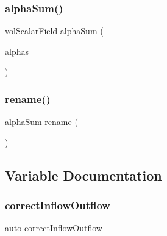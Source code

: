 \mbox{\label{alphaEqns__2p_8H_a3ab8a679df9d81448b079e49656fb68b}} 
\subsubsection{\texorpdfstring{alpha\+Sum()}{alphaSum()}}
{\footnotesize\ttfamily vol\+Scalar\+Field alpha\+Sum (\begin{DoxyParamCaption}\item[{\hyperlink{UEqns__2p_8H_ad67e06bee4c61d3ec617e035493b4722}{alpha1}+\hyperlink{UEqns__2p_8H_abe544d8197b804c4439afde6d860d5d7}{alpha2}+}]{alphas }\end{DoxyParamCaption})}

\mbox{\label{alphaEqns__2p_8H_af1e0a8120145b9a722d2cbde048f2776}} 
\subsubsection{\texorpdfstring{rename()}{rename()}}
{\footnotesize\ttfamily \hyperlink{alphaEqns__2p_8H_a3ab8a679df9d81448b079e49656fb68b}{alpha\+Sum} rename (\begin{DoxyParamCaption}\item[{\char`\"{}sum(\hyperlink{UEqn__1pl_8H_a7fe02434a19f3e00e927f32adcbb193b}{alpha})\char`\"{}}]{ }\end{DoxyParamCaption})}



\subsection{Variable Documentation}
\mbox{\label{alphaEqns__2p_8H_a09af02a4dbb4e475efb7755f0dd0bebd}} 
\subsubsection{\texorpdfstring{correct\+Inflow\+Outflow}{correctInflowOutflow}}
{\footnotesize\ttfamily auto correct\+Inflow\+Outflow}

